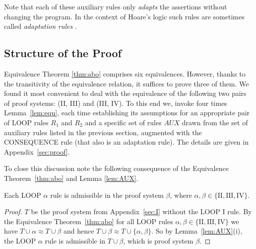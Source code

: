 \documentclass[runningheads]{llncs}       %
\newcommand{\AUX}{\mathit{AUX}}
\begin{document}


Note that each of these auxiliary rules only \emph{adapts} the assertions without changing the program.
In the context of Hoare's logic such rules are sometimes called \emph{adaptation rules}
\cite{Hoa71,Old83,GR16}.



\subsection{Structure of the Proof}
\label{subsec:structure}

Equivalence Theorem \ref{thm:abo} comprises six equivalences. However,
thanks to the transitivity of the equivalence relation, it suffices to
prove three of them. We found it most convenient to deal with the
equivalence of the following two pairs of proof systems: (II, III) and
(III, IV). To this end we, invoke four times
Lemma~\ref{lem:equ}, each time establishing its assumptions for an
appropriate pair of LOOP rules $R_1$ and $R_2$ and a specific set of
rules $\AUX$ drawn from the set of auxiliary rules listed in the
previous section, augmented with the CONSEQUENCE rule (that also is an
adaptation rule).  The details are given in Appendix~\ref{sec:proof}.

To close this discussion note the following consequence of the Equivalence Theorem~\ref{thm:abo}
and Lemma \ref{lem:AUX}.

\begin{corollary} \label{corr:admiss}
Each {\rm LOOP} $\alpha$ rule is admissible in the proof system $\beta$, 
        where $\alpha, \beta \in \{\mathrm{II, III, IV}\}$.
\end{corollary}


\begin{proof}
  $T$ be the proof system from Appendix~\ref{sec:I} without the LOOP I
  rule.  By the Equivalence Theorem~\ref{thm:abo} for all LOOP rules
  $\alpha, \beta \in \{\mathrm{II, III, IV}\}$ we have
  $T \cup \alpha \approx T \cup \beta$ and hence
  $T \cup \beta \approx T \cup \{\alpha, \beta\}$.  So by
  Lemma~\ref{lem:AUX}(i), the LOOP $\alpha$ rule is 
  admissible in $T \cup \beta$, which is proof system $\beta$.
\HB
\end{proof}
\end{document}
